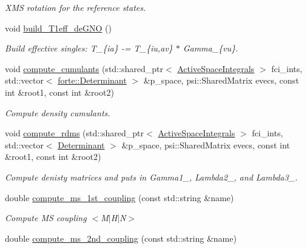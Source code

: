 \begin{DoxyCompactItemize}
\begin{DoxyCompactList}\small\item\em X\+MS rotation for the reference states. \end{DoxyCompactList}\item 
void \mbox{\hyperlink{classforte_1_1_d_s_r_g___m_r_p_t2_a0e238a680593f2011ea5d33b7c062a4b}{build\+\_\+\+T1eff\+\_\+de\+G\+NO}} ()
\begin{DoxyCompactList}\small\item\em Build effective singles\+: T\+\_\+\{ia\} -\/= T\+\_\+\{iu,av\} $\ast$ Gamma\+\_\+\{vu\}. \end{DoxyCompactList}\item 
void \mbox{\hyperlink{classforte_1_1_d_s_r_g___m_r_p_t2_aa847ed192819d46c2631d12ebf783cf9}{compute\+\_\+cumulants}} (std\+::shared\+\_\+ptr$<$ \mbox{\hyperlink{classforte_1_1_active_space_integrals}{Active\+Space\+Integrals}} $>$ fci\+\_\+ints, std\+::vector$<$ \mbox{\hyperlink{namespaceforte_a2076c63fd7b8732004d9e1442ce527c1}{forte\+::\+Determinant}} $>$ \&p\+\_\+space, psi\+::\+Shared\+Matrix evecs, const int \&root1, const int \&root2)
\begin{DoxyCompactList}\small\item\em Compute density cumulants. \end{DoxyCompactList}\item 
void \mbox{\hyperlink{classforte_1_1_d_s_r_g___m_r_p_t2_af254509d7ec7a2f9d0fa985dc4e603e4}{compute\+\_\+rdms}} (std\+::shared\+\_\+ptr$<$ \mbox{\hyperlink{classforte_1_1_active_space_integrals}{Active\+Space\+Integrals}} $>$ fci\+\_\+ints, std\+::vector$<$ \mbox{\hyperlink{namespaceforte_a2076c63fd7b8732004d9e1442ce527c1}{Determinant}} $>$ \&p\+\_\+space, psi\+::\+Shared\+Matrix evecs, const int \&root1, const int \&root2)
\begin{DoxyCompactList}\small\item\em Compute denisty matrices and puts in Gamma1\+\_\+, Lambda2\+\_\+, and Lambda3\+\_\+. \end{DoxyCompactList}\item 
double \mbox{\hyperlink{classforte_1_1_d_s_r_g___m_r_p_t2_ab26d66a2079561ba8c7f591eb3fa93da}{compute\+\_\+ms\+\_\+1st\+\_\+coupling}} (const std\+::string \&name)
\begin{DoxyCompactList}\small\item\em Compute MS coupling $<$M$\vert$\+H$\vert$N$>$ \end{DoxyCompactList}\item 
double \mbox{\hyperlink{classforte_1_1_d_s_r_g___m_r_p_t2_aafcf6bcdd3d59f232a61125d2b35c61a}{compute\+\_\+ms\+\_\+2nd\+\_\+coupling}} (const std\+::string \&name)

\end{DoxyCompactItemize}
